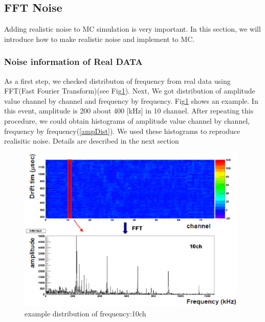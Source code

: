 \subsection{FFT Noise}
 Adding realistic noise to MC simulation is very important. In this section, we will introduce how to make realistic noise and implement to MC.\\

\subsubsection{Noise information of Real DATA}
 As a first step, we checked distributon of frequency from real data using FFT(Fast Fourier Transform)(see Fig\ref{example10ch}). Next, We got distribution of amplitude value channel by channel and frequency by frequency. Fig\ref{example10ch} shows an example. In this event, amplitude is 200 about 400 [kHz] in 10 channel. After repeating this procedure, we could obtain histograms of amplitude value channel by channel, frequency by frequency(\ref{ampDist}). We used these histograms to reproduce realisitic noise. Details are described in the next section
\begin{figure}[!htb]
  \centering
  \centering
  \includegraphics[width=11cm,clip]{./fig/example10ch.eps}
  \caption{example distribution of frequency:10ch}
  \label{example10ch}
\end{figure}
